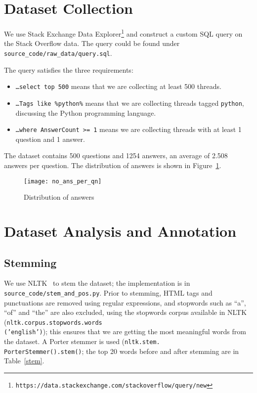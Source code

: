 \section{Dataset Collection}

We use Stack Exchange Data
Explorer\footnote{\texttt{https://data.stackexchange.com/stackoverflow/query/new}}
and construct a custom SQL query on the Stack Overflow data. The query could be
found under \texttt{source\_code/raw\_data/query.sql}.

The query satisfies the three requirements:

\begin{itemize}
    \item \texttt{\ldots select top 500} means that we are collecting at least
    500 threads.
    \item \texttt{\ldots Tags like \textquotesingle{}\%python\%\textquotesingle{}}
    means that we are collecting threads tagged \texttt{python}, discussing the
    Python programming language.
    \item \texttt{\ldots where AnswerCount >= 1} means we are collecting
    threads with at least 1 question and 1 answer.
\end{itemize}

The dataset contains 500 questions and 1254 answers, an average of 2.508 answers
per question. The distribution of answers is shown in Figure~\ref{ans-dist}.

\begin{figure}[htp]
\texttt{[image: no\_ans\_per\_qn]}
\caption{Distribution of answers}\label{ans-dist}
\end{figure}

\section{Dataset Analysis and Annotation}

\subsection{Stemming}

We use NLTK~\cite{nltk} to stem the dataset; the implementation is in
\texttt{source\_code/stem\_and\_pos.py}.
Prior to stemming, HTML tags and punctuations are removed using regular
expressions, and stopwords such as ``a'', ``of'' and ``the'' are also
excluded, using the stopwords corpus available in NLTK
(\texttt{nltk.corpus.stopwords.words\\('english')}); this ensures that we are
getting the most meaningful words from the dataset. A Porter stemmer is 
used (\texttt{nltk.stem.\\PorterStemmer().stem()}; the top 20 words before
and after stemming are in Table~\ref{stem}.

